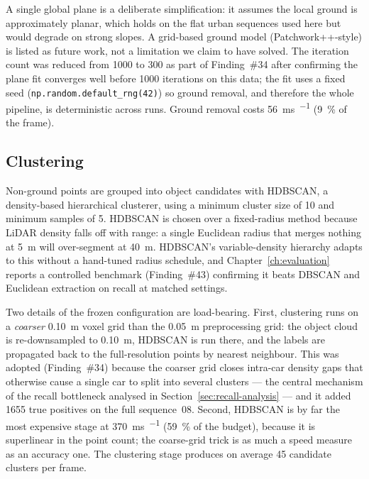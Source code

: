 A single global plane is a deliberate simplification: it assumes the local ground
is approximately planar, which holds on the flat urban sequences used here but
would degrade on strong slopes. A grid-based ground model (Patchwork++-style) is
listed as future work, not a limitation we claim to have solved. The iteration
count was reduced from \num{1000} to \num{300} as part of Finding~\#34 after
confirming the plane fit converges well before \num{1000} iterations on this
data; the fit uses a fixed seed (\texttt{np.random.default\_rng(42)}) so ground
removal, and therefore the whole pipeline, is deterministic across runs. Ground
removal costs \SI{56}{\milli\second\per\frame} (\SI{9}{\percent} of the frame).

\subsection{Clustering}
\label{sec:pipeline-cluster}

Non-ground points are grouped into object candidates with HDBSCAN, a
density-based hierarchical clusterer, using a minimum cluster size of \num{10}
and minimum samples of \num{5}. HDBSCAN is chosen over a fixed-radius method
because LiDAR density falls off with range: a single Euclidean radius that merges
nothing at \SI{5}{\meter} will over-segment at \SI{40}{\meter}. HDBSCAN's
variable-density hierarchy adapts to this without a hand-tuned radius schedule,
and Chapter~\ref{ch:evaluation} reports a controlled benchmark (Finding~\#43) confirming it beats
DBSCAN and Euclidean extraction on recall at matched settings.

Two details of the frozen configuration are load-bearing. First, clustering runs
on a \emph{coarser} \SI{0.10}{\meter} voxel grid than the \SI{0.05}{\meter}
preprocessing grid: the object cloud is re-downsampled to \SI{0.10}{\meter},
HDBSCAN is run there, and the labels are propagated back to the full-resolution
points by nearest neighbour. This was adopted (Finding~\#34) because the coarser
grid closes intra-car density gaps that otherwise cause a single car to split
into several clusters --- the central mechanism of the recall bottleneck analysed
in Section~\ref{sec:recall-analysis} --- and it added \num{1655} true positives on the full sequence~08.
Second, HDBSCAN is by far the most expensive stage at
\SI{370}{\milli\second\per\frame} (\SI{59}{\percent} of the budget), because it is
superlinear in the point count; the coarse-grid trick is as much a speed measure
as an accuracy one. The clustering stage produces on average \num{45} candidate
clusters per frame.


